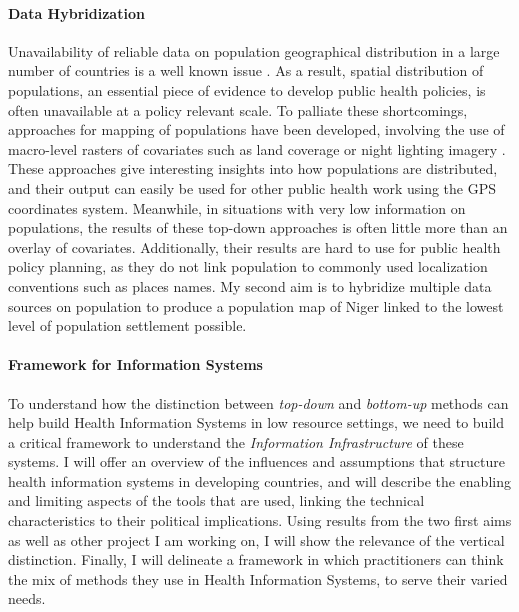\paragraph{Data Hybridization} Unavailability of reliable data on population geographical distribution in a large number of countries is a well known issue \citep{mahapatra_civil_2007,mikkelsen_global_2015}. As a result, spatial distribution of populations, an essential piece of evidence to develop public health policies, is often unavailable at a policy relevant scale. To palliate these shortcomings, approaches for mapping of populations have been developed, involving the use of macro-level rasters of covariates such as land coverage or night lighting imagery  \citep{linard_population_2012,stevens_disaggregating_2015}. These approaches give interesting insights into how populations are distributed, and their output can easily be used for other public health work using the GPS coordinates system. Meanwhile, in situations with very low information on populations, the results of these top-down approaches is often little more than an overlay of covariates. Additionally, their results are hard to use for public health policy planning, as they do not link population to commonly used localization conventions such as places names. My second aim is to hybridize multiple data sources on population to produce a population map of Niger linked to the lowest level of population settlement possible.

\paragraph{Framework for Information Systems} To understand how the distinction between \textit{top-down} and \textit{bottom-up} methods can help build  Health Information Systems in low resource settings, we need to build a critical framework to understand the \textit{Information Infrastructure} \citep{hunsinger_toward_2009} of these systems. I will offer an overview of the influences and assumptions that structure health information systems in developing countries, and will describe the enabling and limiting aspects of the tools that are used, linking the technical characteristics to their political implications. Using results from the two first aims as well as other project I am working on, I will show the relevance of the vertical distinction. Finally, I will delineate a framework in which practitioners can think the mix of methods they use in Health Information Systems, to serve their varied needs.

